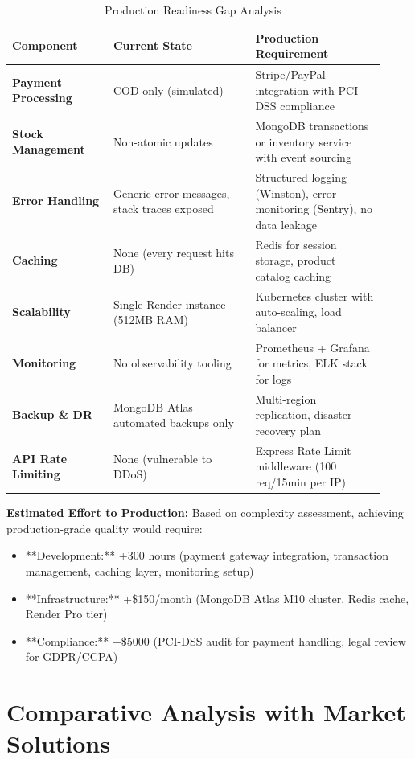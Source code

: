 \begin{table}[H]
\centering
\caption{Production Readiness Gap Analysis}
\label{tab:production_gaps}
\small
\begin{tabular}{@{}p{0.25\linewidth}p{0.35\linewidth}p{0.32\linewidth}@{}}
\toprule
\textbf{Component} & \textbf{Current State} & \textbf{Production Requirement} \\
\midrule
\textbf{Payment Processing} & COD only (simulated) & Stripe/PayPal integration with PCI-DSS compliance \\
\textbf{Stock Management} & Non-atomic updates & MongoDB transactions or inventory service with event sourcing \\
\textbf{Error Handling} & Generic error messages, stack traces exposed & Structured logging (Winston), error monitoring (Sentry), no data leakage \\
\textbf{Caching} & None (every request hits DB) & Redis for session storage, product catalog caching \\
\textbf{Scalability} & Single Render instance (512MB RAM) & Kubernetes cluster with auto-scaling, load balancer \\
\textbf{Monitoring} & No observability tooling & Prometheus + Grafana for metrics, ELK stack for logs \\
\textbf{Backup \& DR} & MongoDB Atlas automated backups only & Multi-region replication, disaster recovery plan \\
\textbf{API Rate Limiting} & None (vulnerable to DDoS) & Express Rate Limit middleware (100 req/15min per IP) \\
\bottomrule
\end{tabular}
\end{table}

\textbf{Estimated Effort to Production:} Based on complexity assessment, achieving production-grade quality would require:
\begin{itemize}
    \item **Development:** +300 hours (payment gateway integration, transaction management, caching layer, monitoring setup)
    \item **Infrastructure:** +\$150/month (MongoDB Atlas M10 cluster, Redis cache, Render Pro tier)
    \item **Compliance:** +\$5000 (PCI-DSS audit for payment handling, legal review for GDPR/CCPA) 
\end{itemize}

\section{Comparative Analysis with Market Solutions}

